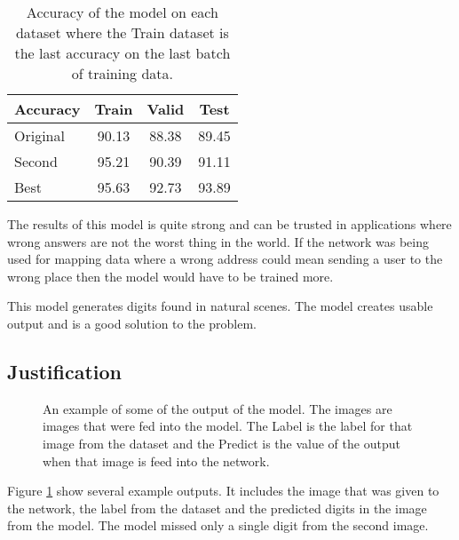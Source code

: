 \documentclass[12pt,twocolumn,letterpaper]{article}
\begin{document}
\begin{table}
\begin{center}
\begin{tabular}{|l|c|c|c|}
\hline
Accuracy & Train & Valid & Test \\
\hline
Original & 90.13 & 88.38 & 89.45 \\
\hline
Second & 95.21 & 90.39 & 91.11 \\
\hline
Best & 95.63 & 92.73 & 93.89 \\
\hline
\end{tabular}
\end{center}
\caption{Accuracy of the model on each dataset where the Train dataset is the
last accuracy on the last batch of training data.}
\label{table:acc}
\end{table}

The results of this model is quite strong and can be trusted in applications where
wrong answers are not the worst thing in the world. If the network was being used 
for mapping data where a wrong address could mean sending a user to the wrong place 
then the model would have to be trained more.

This model generates digits found in natural scenes. The model creates usable 
output and is a good solution to the problem.

\subsection{Justification}

\begin{figure}[t]
\begin{center}
\end{center}
   \caption{An example of some of the output of the model. The images are images
   that were fed into the model. The Label is the label for that image from the 
   dataset and the Predict is the value of the output when that image is feed into 
   the network.}
\label{fig:output}
\end{figure}

Figure \ref{fig:output} show several example outputs. It includes the image that 
was given to the network, the label from the dataset and the predicted digits 
in the image from the model. The model missed only a single digit from the second 
image. 
\end{document}
